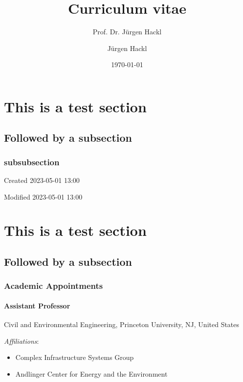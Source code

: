 \documentclass[
11pt,
titleformat=cv,
]{princeton}
\author{Jürgen Hackl}
\date{\today}
\title{Curriculum vitae}
\subtitle{Prof. Dr. Jürgen Hackl}
\begin{document}
\maketitle



\blindtext

\section{This is a test section}

\blindtext

\subsection{Followed by a subsection}
\subsubsection{subsubsection}

\begin{margindescription}
\item[Created] 2023-05-01 13:00
\item[Modified] 2023-05-01 13:00
\end{margindescription}

\blindtext
\blindtext
\blindtext
\blindtext
\blindtext

\section{This is a test section}
\subsection{Followed by a subsection}
\subsubsection{Academic Appointments}

\paragraph{Assistant Professor}

Civil and Environmental Engineering, Princeton University, NJ, United States

\textit{Affiliations}:
\begin{itemize}
\item Complex Infrastructure Systems Group
\item Andlinger Center for Energy and the Environment
\end{itemize}
\end{document}
